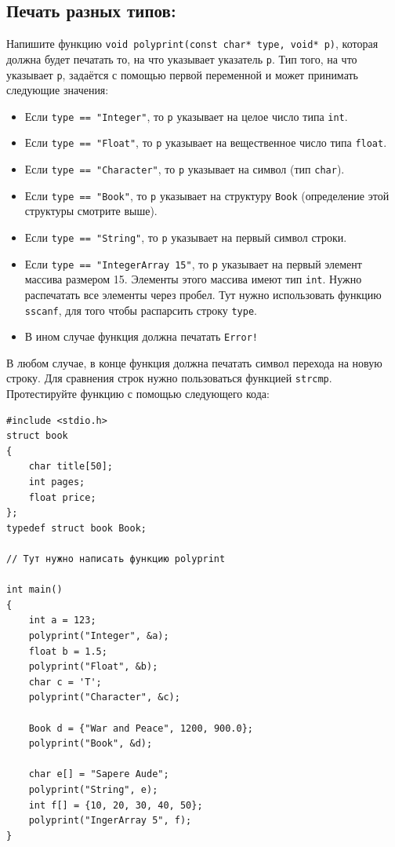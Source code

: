 \documentclass{article}
\begin{document}
\newpage
\subsection{Печать разных типов:}
Напишите функцию \texttt{void polyprint(const char* type, void* p)}, которая должна будет печатать то, на что указывает указатель \texttt{p}. Тип того, на что указывает \texttt{p}, задаётся с помощью первой переменной и может принимать следующие значения:
\begin{itemize}
\item Если \texttt{type == "Integer"}, то \texttt{p} указывает на целое число типа \texttt{int}.
\item Если \texttt{type == "Float"}, то \texttt{p} указывает на вещественное число типа \texttt{float}.
\item Если \texttt{type == "Character"}, то \texttt{p} указывает на символ (тип \texttt{char}).
\item Если \texttt{type == "Book"}, то \texttt{p} указывает на структуру \texttt{Book} (определение этой структуры смотрите выше).
\item Если \texttt{type == "String"}, то \texttt{p} указывает на первый символ строки.
\item Если \texttt{type == "IntegerArray 15"}, то \texttt{p} указывает на первый элемент массива размером 15. Элементы этого массива имеют тип \texttt{int}. Нужно распечатать все элементы через пробел. Тут нужно использовать функцию \texttt{sscanf}, для того чтобы распарсить строку \texttt{type}.
\item В ином случае функция должна печатать \texttt{Error!}
\end{itemize}
В любом случае, в конце функция должна печатать символ перехода на новую строку. Для сравнения строк нужно пользоваться функцией \texttt{strcmp}. Протестируйте функцию с помощью следующего кода:

\begin{lstlisting}
#include <stdio.h>
struct book 
{
    char title[50];
    int pages;
    float price;
};
typedef struct book Book;

// Тут нужно написать функцию polyprint

int main() 
{
    int a = 123;
    polyprint("Integer", &a);
    float b = 1.5;
    polyprint("Float", &b);
    char c = 'T';
    polyprint("Character", &c);
    
    Book d = {"War and Peace", 1200, 900.0};
    polyprint("Book", &d);
    
    char e[] = "Sapere Aude";
    polyprint("String", e);
    int f[] = {10, 20, 30, 40, 50};
    polyprint("IngerArray 5", f);
}
\end{lstlisting}
\end{document}
